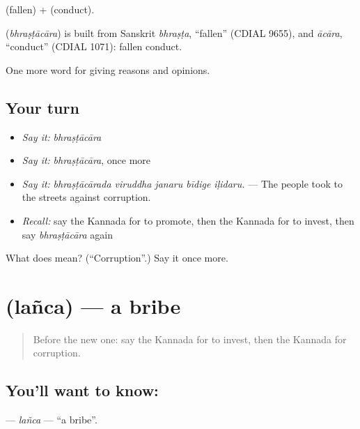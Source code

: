  (fallen) +  (conduct).

\begin{cousinweb}
\textbf{} (\emph{bhraṣṭācāra}) is built from Sanskrit \emph{bhraṣṭa}, \textquotedblleft{}fallen\textquotedblright{} (CDIAL 9655), and \emph{ācāra}, \textquotedblleft{}conduct\textquotedblright{} (CDIAL 1071): fallen conduct.
\end{cousinweb}

\begin{grammarlens}[title={What you've built}]
One more word for giving reasons and opinions.
\end{grammarlens}

\subsection*{Your turn}
\begin{itemize}
\raggedright
  \item \emph{Say it:} \emph{bhraṣṭācāra}
  \item \emph{Say it:} \emph{bhraṣṭācāra}, once more
  \item \emph{Say it:} \emph{bhraṣṭācārada viruddha janaru bīdige iḷidaru.} — The people took to the streets against corruption.
  \item \emph{Recall:} say the Kannada for to promote, then the Kannada for to invest, then say \emph{bhraṣṭācāra} again
\end{itemize}

\begin{tcolorbox}[breakable,colback=teal!4,colframe=teal!35!black,title={Before you move on}]
What does  mean? (\textquotedblleft{}Corruption\textquotedblright{}.) Say it once more.
\end{tcolorbox}
\section[\texorpdfstring{\kn{ಲಂಚ} (lañca)}{ಲಂಚ (lañca)}]{ (lañca) — a bribe}

\label{lesson:KA-C402-lanca}



\begin{quote}
Before the new one: say the Kannada for to invest, then the Kannada for corruption.
\end{quote}

\subsection*{You'll want to know: }
\textbf{} — \emph{lañca} — \textquotedblleft{}a bribe\textquotedblright{}.

